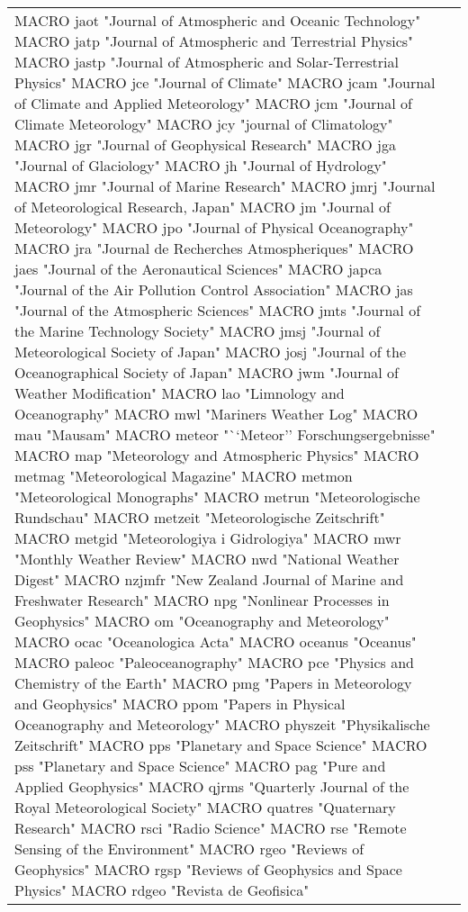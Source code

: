 \documentclass{article}
\begin{document}
\begin{longtable}{lp{6cm}}
MACRO {jaot} {"Journal of Atmospheric and Oceanic Technology"}
MACRO {jatp} {"Journal of Atmospheric and Terrestrial Physics"}
MACRO {jastp} {"Journal of Atmospheric and Solar-Terrestrial Physics"}
MACRO {jce} {"Journal of Climate"}
MACRO {jcam} {"Journal of Climate and Applied Meteorology"}
MACRO {jcm} {"Journal of Climate Meteorology"}
MACRO {jcy} {"journal of Climatology"}
MACRO {jgr} {"Journal of Geophysical Research"}
MACRO {jga} {"Journal of Glaciology"}
MACRO {jh} {"Journal of Hydrology"}
MACRO {jmr} {"Journal of Marine Research"}
MACRO {jmrj} {"Journal of Meteorological Research, Japan"}
MACRO {jm} {"Journal of Meteorology"}
MACRO {jpo} {"Journal of Physical Oceanography"}
MACRO {jra} {"Journal de Recherches Atmospheriques"}
MACRO {jaes} {"Journal of the Aeronautical Sciences"}
MACRO {japca} {"Journal of the Air Pollution Control Association"}
MACRO {jas} {"Journal of the Atmospheric Sciences"}
MACRO {jmts} {"Journal of the Marine Technology Society"}
MACRO {jmsj} {"Journal of Meteorological Society of Japan"}
MACRO {josj} {"Journal of the Oceanographical Society of Japan"}
MACRO {jwm} {"Journal of Weather Modification"}
MACRO {lao} {"Limnology and Oceanography"}
MACRO {mwl} {"Mariners Weather Log"}
MACRO {mau} {"Mausam"}
MACRO {meteor} {"``Meteor'' Forschungsergebnisse"}
MACRO {map} {"Meteorology and Atmospheric Physics"}
MACRO {metmag} {"Meteorological Magazine"}
MACRO {metmon} {"Meteorological Monographs"}
MACRO {metrun} {"Meteorologische Rundschau"}
MACRO {metzeit} {"Meteorologische Zeitschrift"}
MACRO {metgid} {"Meteorologiya i Gidrologiya"}
MACRO {mwr} {"Monthly Weather Review"}
MACRO {nwd} {"National Weather Digest"}
MACRO {nzjmfr} {"New Zealand Journal of Marine and Freshwater Research"}
MACRO {npg} {"Nonlinear Processes in Geophysics"}
MACRO {om} {"Oceanography and Meteorology"}
MACRO {ocac} {"Oceanologica Acta"}
MACRO {oceanus} {"Oceanus"}
MACRO {paleoc} {"Paleoceanography"}
MACRO {pce} {"Physics and Chemistry of the Earth"}
MACRO {pmg} {"Papers in Meteorology and Geophysics"}
MACRO {ppom} {"Papers in Physical Oceanography and Meteorology"}
MACRO {physzeit} {"Physikalische Zeitschrift"}
MACRO {pps} {"Planetary and Space Science"}
MACRO {pss} {"Planetary and Space Science"}
MACRO {pag} {"Pure and Applied Geophysics"}
MACRO {qjrms} {"Quarterly Journal of the Royal Meteorological Society"}
MACRO {quatres} {"Quaternary Research"}
MACRO {rsci} {"Radio Science"}
MACRO {rse} {"Remote Sensing of the Environment"}
MACRO {rgeo} {"Reviews of Geophysics"}
MACRO {rgsp} {"Reviews of Geophysics and Space Physics"}
MACRO {rdgeo} {"Revista de Geofisica"}

\end{longtable}
\end{document}
